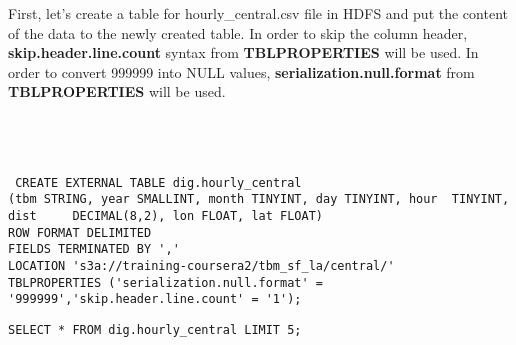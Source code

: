 \documentclass[a4paper,
							12pt,
							oneside,
							openright,
							DIV10,
							numbers=noendperiod
							]{scrreprt} %
\begin{document}
\noindent
First, let's create a table for hourly\_central.csv file in HDFS and put the content of the data to the newly created table. In order to skip the column header, \textbf{skip.header.line.count} syntax from \textbf{TBLPROPERTIES} will be used. In order to convert 999999 into NULL values, \textbf{serialization.null.format} from \textbf{TBLPROPERTIES} will be used. \\
\\
\\
\\

\begin{lstlisting}
 CREATE EXTERNAL TABLE dig.hourly_central 
(tbm STRING, year SMALLINT, month TINYINT, day TINYINT, hour  TINYINT, dist 	DECIMAL(8,2), lon FLOAT, lat FLOAT)
ROW FORMAT DELIMITED
FIELDS TERMINATED BY ','
LOCATION 's3a://training-coursera2/tbm_sf_la/central/'
TBLPROPERTIES ('serialization.null.format' = '999999','skip.header.line.count' = '1');
\end{lstlisting}

\begin{lstlisting}
SELECT * FROM dig.hourly_central LIMIT 5;
\end{lstlisting}
\end{document}
